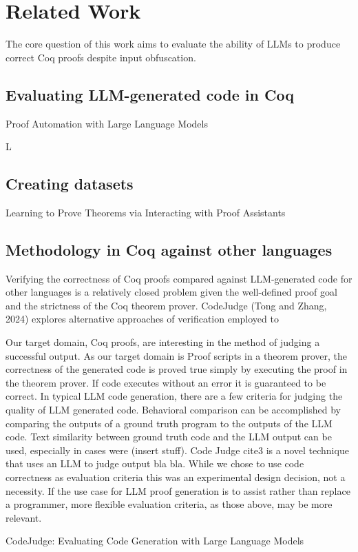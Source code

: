 
\section{Related Work}
\label{sec:related-work}

The core question of this work aims to evaluate
the ability of LLMs to produce correct Coq proofs
despite input obfuscation.

\subsection
{Evaluating LLM-generated code in Coq}
Proof Automation with Large Language Models

L

\subsection
{Creating datasets}
Learning to Prove Theorems via
Interacting with Proof Assistants


\subsection
{Methodology in Coq against other languages}

Verifying the correctness of Coq proofs
compared against LLM-generated code for other
languages is a relatively closed problem
given the well-defined proof goal and the
strictness of the Coq theorem prover.
CodeJudge (Tong and Zhang, 2024) explores
alternative approaches of verification
employed to 

Our target domain, Coq proofs, are interesting in the method of judging a successful output.
As our target domain is Proof scripts in a theorem prover,
the correctness of the generated code is proved true
simply by executing the proof in the theorem prover.
If code executes without an error it is guaranteed to be correct.
In typical LLM code generation,
there are a few criteria for judging the quality of LLM generated code.  
Behavioral comparison can be accomplished by comparing the outputs of a ground truth program 
to the outputs of the LLM code. 
Text similarity between ground truth code and the LLM output can be used, 
especially in cases were (insert stuff). 
Code Judge cite3 is a novel technique that uses an LLM to judge output bla bla. 
While we chose to use code correctness as evaluation criteria 
this was an experimental design decision, not a necessity.
If the use case for LLM proof generation is to assist 
rather than replace a programmer, 
more flexible evaluation criteria, as those above, may be more relevant. 

CodeJudge: Evaluating Code Generation 
with Large Language Models